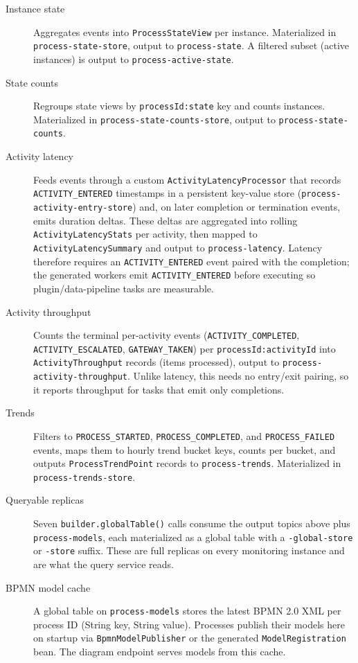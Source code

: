 \begin{description}
\item[Instance state] Aggregates events into \texttt{ProcessStateView} per instance.
Materialized in \\ \texttt{process-state-store}, output to \texttt{process-state}.
A filtered subset (active instances) is output to \texttt{process-active-state}.
\item[State counts] Regroups state views by \texttt{processId:state} key and counts
instances. Materialized in \texttt{process-state-counts-store}, output to
\texttt{process-state-counts}.
\item[Activity latency] Feeds events through a custom \texttt{ActivityLatencyProcessor}
that records \\ \texttt{ACTIVITY\_ENTERED} timestamps in a persistent key-value store
(\texttt{process-activity-entry-store}) and, on later completion or termination events,
emits duration deltas. These deltas are aggregated into rolling \texttt{ActivityLatencyStats}
per activity, then mapped to \texttt{ActivityLatencySummary} and output to
\texttt{process-latency}. Latency therefore requires an \texttt{ACTIVITY\_ENTERED}
event paired with the completion; the generated workers emit \texttt{ACTIVITY\_ENTERED}
before executing so plugin/data-pipeline tasks are measurable.
\item[Activity throughput] Counts the terminal per-activity events
(\texttt{ACTIVITY\_COMPLETED}, \texttt{ACTIVITY\_ESCALATED}, \texttt{GATEWAY\_TAKEN}) per
\texttt{processId:activityId} into \texttt{ActivityThroughput} records (items processed),
output to \texttt{process-activity-throughput}. Unlike latency, this needs no
entry/exit pairing, so it reports throughput for tasks that emit only completions.
\item[Trends] Filters to \texttt{PROCESS\_STARTED}, \texttt{PROCESS\_COMPLETED},
and \texttt{PROCESS\_FAILED} events, maps them to hourly trend bucket keys,
counts per bucket, and outputs \texttt{ProcessTrendPoint} records to
\texttt{process-trends}. Materialized in \texttt{process-trends-store}.
\item[Queryable replicas] Seven \texttt{builder.globalTable()} calls consume the
output topics above plus \\ \texttt{process-models}, each materialized as a global table
with a \texttt{-global-store} or \texttt{-store} suffix. These are full replicas on
every monitoring instance and are what the query service reads.
\item[BPMN model cache] A global table on \texttt{process-models} stores the latest
BPMN 2.0 XML per process ID (String key, String value). Processes publish their
models here on startup via \texttt{BpmnModelPublisher} or the generated
\texttt{ModelRegistration} bean. The diagram endpoint serves models from this cache.
\end{description}

